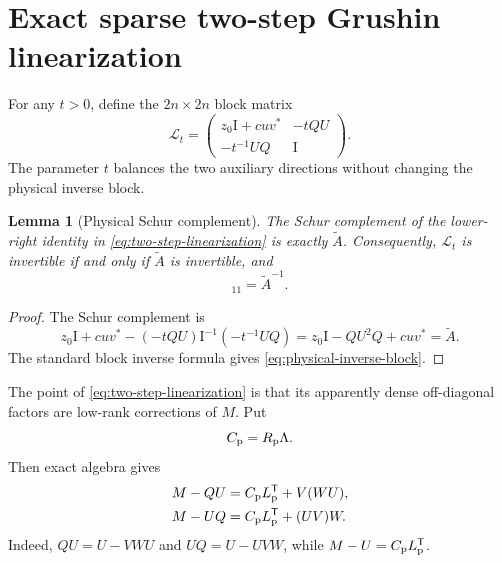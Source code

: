 \documentclass[11pt]{article}
\newtheorem{lemma}[theorem]{Lemma}
\theoremstyle{definition}
\theoremstyle{remark}
\newcommand{\Id}{\mathrm I}
\newcommand{\Atilde}{\widetilde A}
\newcommand{\Lmat}{\mathcal L}
\begin{document}
\section{Exact sparse two-step Grushin linearization}
\label{sec:linearization}

For any $t>0$, define the $2n\times2n$ block matrix
\begin{equation}
 \Lmat_t=
 \begin{pmatrix}
  z_0\Id+cuv^* & -tQU\\
  -t^{-1}UQ & \Id
 \end{pmatrix}.
 \label{eq:two-step-linearization}
\end{equation}
The parameter $t$ balances the two auxiliary directions without changing
the physical inverse block.

\begin{lemma}[Physical Schur complement]
\label{lem:physical-schur}
The Schur complement of the lower-right identity in
\cref{eq:two-step-linearization} is exactly $\Atilde$.  Consequently,
$\Lmat_t$ is invertible if and only if $\Atilde$ is invertible, and
\begin{equation}
 [\Lmat_t^{-1}]_{11}=\Atilde^{-1}.
 \label{eq:physical-inverse-block}
\end{equation}
\end{lemma}

\begin{proof}
The Schur complement is
\[
 z_0\Id+cuv^*-(-tQU)\Id^{-1}(-t^{-1}UQ)
 =z_0\Id-QU^2Q+cuv^*=\Atilde.
\]
The standard block inverse formula gives
\cref{eq:physical-inverse-block}.
\end{proof}

The point of \cref{eq:two-step-linearization} is that its apparently dense
off-diagonal factors are low-rank corrections of $M$.  Put
\begin{equation}
 C_{\rm p}=R_{\rm p}\Lambda.
\end{equation}
Then exact algebra gives
\begin{align}
 M-QU
 &=C_{\rm p}L_{\rm p}^{\mathsf T}+V(WU),
 \label{eq:top-correction}\\
 M-UQ
 &=C_{\rm p}L_{\rm p}^{\mathsf T}+(UV)W.
 \label{eq:bottom-correction}
\end{align}
Indeed, $QU=U-VWU$ and $UQ=U-UVW$, while
$M-U=C_{\rm p}L_{\rm p}^{\mathsf T}$.
\end{document}

